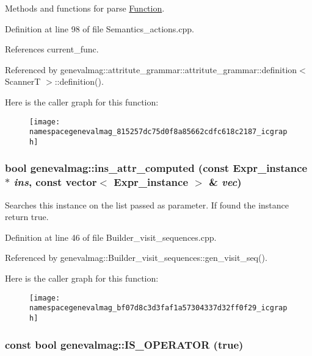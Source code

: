 Methods and functions for parse \hyperlink{classgenevalmag_1_1Function}{Function}. 

Definition at line 98 of file Semantics\_\-actions.cpp.

References current\_\-func.

Referenced by genevalmag::attritute\_\-grammar::attritute\_\-grammar::definition$<$ ScannerT $>$::definition().

Here is the caller graph for this function:\nopagebreak
\begin{figure}[H]
\begin{center}
\leavevmode
\texttt{[image: namespacegenevalmag\_815257dc75d0f8a85662cdfc618c2187\_icgraph]}
\end{center}
\end{figure}
\hypertarget{namespacegenevalmag_bf07d8c3d3faf1a57304337d32ff0f29}{
\subsubsection[{ins\_\-attr\_\-computed}]{\setlength{\rightskip}{0pt plus 5cm}bool genevalmag::ins\_\-attr\_\-computed (const {\bf Expr\_\-instance} $\ast$ {\em ins}, \/  const vector$<$ {\bf Expr\_\-instance} $>$ \& {\em vec})}}
\label{namespacegenevalmag_bf07d8c3d3faf1a57304337d32ff0f29}


Searches this instance on the list passed as parameter. If found the instance return true. 

Definition at line 46 of file Builder\_\-visit\_\-sequences.cpp.

Referenced by genevalmag::Builder\_\-visit\_\-sequences::gen\_\-visit\_\-seq().

Here is the caller graph for this function:\nopagebreak
\begin{figure}[H]
\begin{center}
\leavevmode
\texttt{[image: namespacegenevalmag\_bf07d8c3d3faf1a57304337d32ff0f29\_icgraph]}
\end{center}
\end{figure}
\hypertarget{namespacegenevalmag_29dbe8034050c247526ecae47ff95529}{
\subsubsection[{IS\_\-OPERATOR}]{\setlength{\rightskip}{0pt plus 5cm}const bool genevalmag::IS\_\-OPERATOR (true)}}
\label{namespacegenevalmag_29dbe8034050c247526ecae47ff95529}



